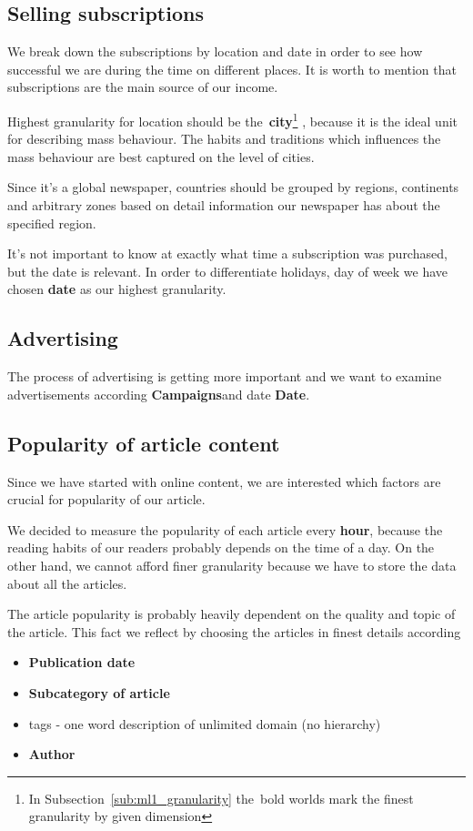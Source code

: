 
\subsection*{Selling subscriptions} 
We break down the subscriptions by location and date in order to see how successful we are during the time on different places. It is worth to mention that subscriptions are the main source of our income. 

Highest granularity for location should be 
the~{\bf city}\footnote{In Subsection~\ref{sub:ml1_granularity} the~bold worlds  mark the finest granularity by given dimension} 
, because it is the ideal unit for describing mass behaviour.  The habits and traditions  which influences the mass behaviour are best captured on the level of cities. 

Since it's a global newspaper, countries should be grouped by regions, continents and arbitrary zones based on detail information our newspaper has about the specified region.

It's not important to know at exactly what time a subscription was purchased, but the date is relevant. 
In order to differentiate holidays, day of week we have chosen {\bf date} as our highest granularity. 

\subsection*{Advertising} 
The process of advertising is getting more important
and we want to examine advertisements according {\bf Campaigns}and date {\bf Date}.  

\subsection*{Popularity of article content} 
Since we have started with online content, we are interested which factors are crucial for popularity of our article.

We decided to measure the popularity of each article every {\bf hour}, because the reading habits of our readers probably depends on the time of a day. On the other hand, we cannot afford finer granularity because we have to store the data about all the articles.

The article popularity is probably heavily dependent on the quality and topic of the article. 
This fact we reflect by choosing the articles in finest details
according
\begin{itemize}
    \item {\bf Publication date}
    \item {\bf Subcategory of article}
    \item tags - one word description of unlimited domain (no hierarchy)
    \item {\bf Author}
\end{itemize}


